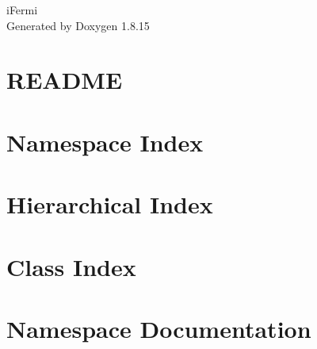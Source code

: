 \let\mypdfximage\pdfximage\def\pdfximage{\immediate\mypdfximage}\documentclass[twoside]{book}
\newcommand{\+}{\discretionary{\mbox{\scriptsize$\hookleftarrow$}}{}{}}
\newcommand{\clearemptydoublepage}{%
  \newpage{\pagestyle{empty}\cleardoublepage}%
}
\begin{document}
\hypersetup{pageanchor=false,
             bookmarksnumbered=true,
             pdfencoding=unicode
            }
\begin{titlepage}
\vspace*{7cm}
\begin{center}%
{\Large i\+Fermi }\\
\vspace*{1cm}
{\large Generated by Doxygen 1.8.15}\\
\end{center}
\end{titlepage}
\clearemptydoublepage
{}
\tableofcontents
\clearemptydoublepage
{}
\hypersetup{pageanchor=true}

\chapter{R\+E\+A\+D\+ME}
\label{md__r_e_a_d_m_e}

\chapter{Namespace Index}

\chapter{Hierarchical Index}

\chapter{Class Index}

\chapter{Namespace Documentation}


\end{document}
